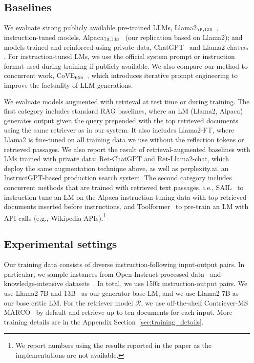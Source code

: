 \documentclass{article} %
\newcommand{\mret}{$\mathcal{R}$\xspace}
\begin{document}
\subsection{Baselines}
We evaluate strong publicly available pre-trained LLMs, Llama2$_{\textsc{7b},\textsc{13b}}$~\citep{touvron2023llama}, instruction-tuned models, Alpaca$_{\textsc{7b},\textsc{13b}}$~\citep{dubois2023alpacafarm} (our replication based on Llama2); and models trained and reinforced using private data, ChatGPT~\citep{ouyang2022training} and Llama2-chat$_{\textsc{13b}}$. 
For instruction-tuned LMs, we use the official system prompt or instruction format used during training if publicly available. 
We also compare our method to concurrent work, CoVE$_\textsc{65b}$~\citep{dhuliawala2023chainofverification}, which introduces iterative prompt engineering to improve the factuality of LLM generations. 

We evaluate models augmented with retrieval at test time or during training. The first category includes standard RAG baselines, where an LM (Llama2, Alpaca) generates output given the query prepended with the top retrieved documents using the same retriever as in our system. It also includes {Llama2-FT}, where Llama2 is fine-tuned on all training data we use without the reflection tokens or retrieved passages.
{We also report the result of retrieval-augmented baselines with LMs trained with private data: Ret-ChatGPT and Ret-Llama2-chat, which deploy the same augmentation technique above, as well as perplexity.ai, an InstructGPT-based production search system. 
}
The second category includes concurrent methods that are trained with retrieved text passages, i.e., { SAIL}~\citep{luo2023sail} to instruction-tune an LM on the Alpaca instruction-tuning data with top retrieved documents inserted before instructions, and {Toolformer}~\citep{schick2023toolformer} to pre-train an LM with API calls (e.g., Wikipedia APIs).\footnote{We report numbers using the results reported in the paper as the implementations are not available.}


\subsection{Experimental settings}
Our training data consists of diverse instruction-following input-output pairs. 
In particular, we sample instances from Open-Instruct processed data~\citep{wang2023far} and knowledge-intensive datasets~\citep{petroni-etal-2021-kilt,stelmakh2022asqa,mihaylov-etal-2018-suit}. 
In total, we use 150k instruction-output pairs. 
We use Llama2 7B and 13B~\citep{touvron2023llama} as our generator base LM, and we use Llama2 7B as our base critic LM. 
For the retriever model \mret, we use off-the-shelf Contriever-MS MARCO~\citep{izacard2021towards} by default and retrieve up to ten documents for each input. 
More training details are in the Appendix Section~\ref{sec:training_details}. 
\end{document}
